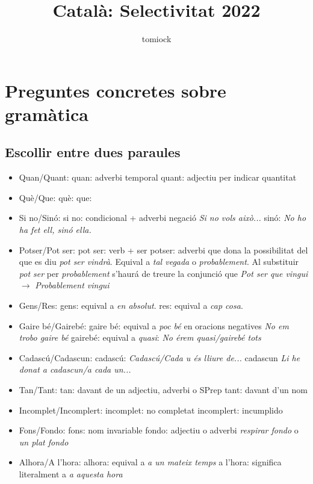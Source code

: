 \documentclass[arial,a4paper,print]{article}
\title{Català: Selectivitat 2022}
\author{tomiock}
\begin{document}
\maketitle

\section{Preguntes concretes sobre gramàtica}

\subsection{Escollir entre dues paraules}
\begin{itemize}
\item Quan/Quant: 
\subitem quan: adverbi temporal
\subitem quant: adjectiu per indicar quantitat
\item Què/Que: 
\subitem què: 
\subitem que: 
\item Si no/Sinó:
\subitem si no: condicional + adverbi negació \textit{Si no vols això...}
\subitem sinó: \textit{No ho ha fet ell, sinó ella.}
\item Potser/Pot ser: 
\subitem pot ser: verb + ser
\subitem potser: adverbi que dona la possibilitat del que es diu \textit{pot ser vindrà}. Equival a \textit{tal vegada} o \textit{probablement}. Al substituir \textit{pot ser} per \textit{probablement} s'haurá de treure la conjunció que \textit{Pot ser que vingui} $\rightarrow$ \textit{Probablement vingui}
\item Gens/Res:
\subitem gens: equival a \textit{en absolut}. 
\subitem res: equival a \textit{cap cosa}. 
\item Gaire bé/Gairebé: 
\subitem gaire bé: equival a \textit{poc bé} en oracions negatives \textit{No em trobo gaire bé}  
\subitem gairebé: equival a \textit{quasi}: \textit{No érem quasi/gairebé tots}
\item Cadascú/Cadascun: 
\subitem cadascú: \textit{Cadascú/Cada u és lliure de...}
\subitem cadascun \textit{Li he donat a cadascun/a cada un...}
\item Tan/Tant: 
\subitem tan: davant de un adjectiu, adverbi o SPrep
\subitem tant: davant d'un nom
\item Incomplet/Incomplert: 
\subitem incomplet: no completat
\subitem incomplert: incumplido 
\item Fons/Fondo:
\subitem fons: nom invariable
\subitem fondo: adjectiu o adverbi \textit{respirar fondo} o \textit{un plat fondo}
\item Alhora/A l'hora: 
\subitem alhora: equival a \textit{a un mateix temps}
\subitem a l'hora: significa literalment a \textit{a aquesta hora}
\end{itemize}
\end{document}
